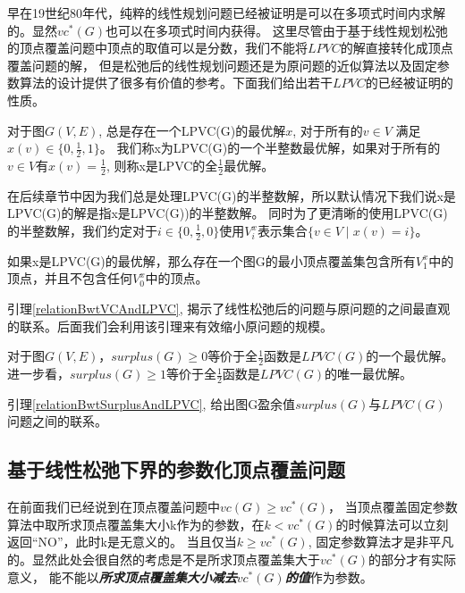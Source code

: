 早在19世纪80年代，纯粹的线性规划问题已经被证明是可以在多项式时间内求解的\cite{khachiian1979polynomial}。显然$vc^{*}(G)$也可以在多项式时间内获得。
这里尽管由于基于线性规划松弛的顶点覆盖问题中顶点的取值可以是分数，我们不能将$LPVC$的解直接转化成顶点覆盖问题的解，
但是松弛后的线性规划问题还是为原问题的近似算法以及固定参数算法的设计提供了很多有价值的参考。下面我们给出若干$LPVC$的已经被证明的性质。
\begin{lemma}
对于图$G(V, E)$, 总是存在一个LPVC(G)的最优解$x$, 对于所有的$v \in V$ 满足$x(v) \in \{0, \frac{1}{2}, 1\}$。
我们称x为LPVC(G)的一个半整数最优解，如果对于所有的$v \in V$有$x(v) = \frac{1}{2}$, 则称x是LPVC的全$\frac{1}{2}$最优解。
\end{lemma}

在后续章节中因为我们总是处理LPVC(G)的半整数解，所以默认情况下我们说x是LPVC(G)的解是指x是LPVC(G))的半整数解。
同时为了更清晰的使用LPVC(G)的半整数解，我们约定对于$i \in \{0, \frac{1}{2}, 0\}$使用$V^x_i$表示集合$\{v \in V\;|\; x(v) = i\}$。

\begin{lemma}\label{relationBwtVCAndLPVC}
如果x是LPVC(G)的最优解，那么存在一个图G的最小顶点覆盖集包含所有$V^x_1$中的顶点，并且不包含任何$V^x_0$中的顶点。
\end{lemma}

引理\ref{relationBwtVCAndLPVC}, 揭示了线性松弛后的问题与原问题的之间最直观的联系。后面我们会利用该引理来有效缩小原问题的规模。

\begin{lemma}\label{relationBwtSurplusAndLPVC}
对于图$G(V, E)$，$surplus(G) \ge 0$等价于全$\frac{1}{2}$函数是$LPVC(G)$的一个最优解。
进一步看，$surplus(G) \ge 1$等价于全$\frac{1}{2}$函数是$LPVC(G)$的唯一最优解。
\end{lemma}

引理\ref{relationBwtSurplusAndLPVC}, 给出图G盈余值$surplus(G)$与$LPVC(G)$问题之间的联系。


\subsection{基于线性松弛下界的参数化顶点覆盖问题}
在前面我们已经说到在顶点覆盖问题中$vc(G)\ge vc^*(G)$，
当顶点覆盖固定参数算法中取所求顶点覆盖集大小k作为的参数，在$k < vc^*(G)$的时候算法可以立刻返回“NO”，此时k是无意义的。
当且仅当$k \ge vc^*(G)$, 固定参数算法才是非平凡的。显然此处会很自然的考虑是不是所求顶点覆盖集大于$vc^*(G)$的部分才有实际意义，
能不能以\textbf{\emph{所求顶点覆盖集大小减去$vc^*(G)$的值}}作为参数。

